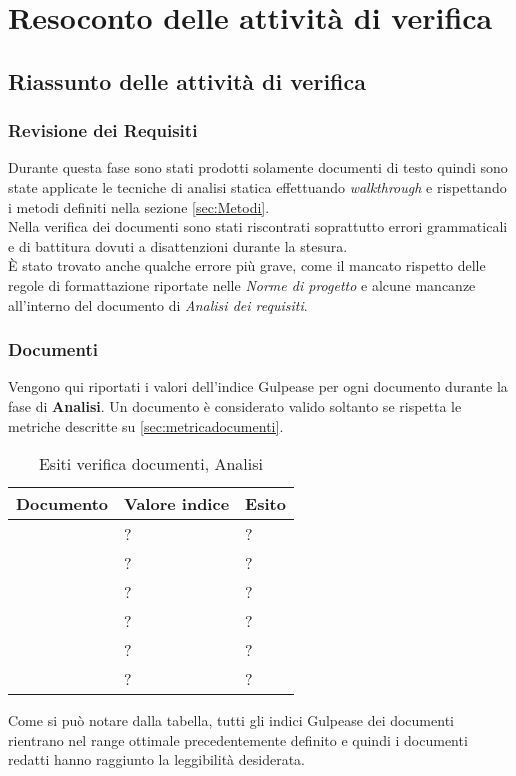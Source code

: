 \section{Resoconto delle attività di verifica}
\subsection{Riassunto delle attività di verifica}
\subsubsection{Revisione dei Requisiti}

Durante questa fase sono stati prodotti solamente documenti di testo quindi sono state applicate le tecniche di analisi statica effettuando \textit{walkthrough} e rispettando i metodi definiti nella sezione \ref{sec:Metodi}.\\
Nella verifica dei documenti sono stati riscontrati soprattutto errori grammaticali e di battitura dovuti a disattenzioni durante la stesura.\\
È stato trovato anche qualche errore più grave, come il mancato rispetto delle regole di formattazione riportate nelle \textit{Norme di progetto} e alcune mancanze all'interno del documento di \textit{Analisi dei requisiti}.\\

\subsubsection{Documenti}

Vengono qui riportati i valori dell’indice Gulpease per ogni documento durante la fase di \textbf{Analisi}. Un documento è considerato valido soltanto se rispetta le metriche descritte su \ref{sec:metricadocumenti}.

\begin{table}[H]
	\centering
	\begin{tabular}{p{}p{}
			p{}}
		\toprule Documento & Valore indice & Esito \\
		\midrule
		\PianoDiProgetto & ? & ? \\
		\AnalisiDeiRequisiti & ? & ? \\
		\NormeDiProgetto & ? & ? \\
		\PianoDiQualifica & ? & ? \\
		\StudioDiFattibilita & ? & ? \\
		\Glossario & ? & ? \\
		\bottomrule
	\end{tabular}
	\label{tab:costorequisiti}
	\caption{Esiti verifica documenti, Analisi}
\end{table}

Come si può notare dalla tabella, tutti gli indici Gulpease dei documenti rientrano nel range ottimale precedentemente definito e quindi i documenti redatti hanno raggiunto la leggibilità desiderata.
